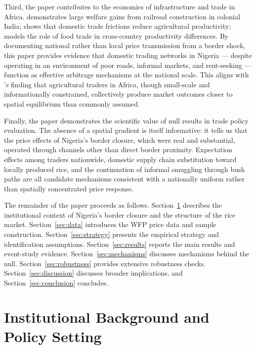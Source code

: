 \documentclass[12pt]{article}
\begin{document}
Third, the paper contributes to the economics of infrastructure and trade in Africa. \citet{donaldson2018railroads} demonstrates large welfare gains from railroad construction in colonial India; \citet{sotelo2020domestic} shows that domestic trade frictions reduce agricultural productivity; \citet{tombe2015geography} models the role of food trade in cross-country productivity differences. By documenting national rather than local price transmission from a border shock, this paper provides evidence that domestic trading networks in Nigeria --- despite operating in an environment of poor roads, informal markets, and rent-seeking --- function as effective arbitrage mechanisms at the national scale. This aligns with \citet{fafchamps2006agricultural}'s finding that agricultural traders in Africa, though small-scale and informationally constrained, collectively produce market outcomes closer to spatial equilibrium than commonly assumed.

Finally, the paper demonstrates the scientific value of null results in trade policy evaluation. The absence of a spatial gradient is itself informative: it tells us that the price effects of Nigeria's border closure, which were real and substantial, operated through channels other than direct border proximity. Expectation effects among traders nationwide, domestic supply chain substitution toward locally produced rice, and the continuation of informal smuggling through bush paths are all candidate mechanisms consistent with a nationally uniform rather than spatially concentrated price response.

The remainder of the paper proceeds as follows. Section~\ref{sec:background} describes the institutional context of Nigeria's border closure and the structure of the rice market. Section~\ref{sec:data} introduces the WFP price data and sample construction. Section~\ref{sec:strategy} presents the empirical strategy and identification assumptions. Section~\ref{sec:results} reports the main results and event-study evidence. Section~\ref{sec:mechanisms} discusses mechanisms behind the null. Section~\ref{sec:robustness} provides extensive robustness checks. Section~\ref{sec:discussion} discusses broader implications, and Section~\ref{sec:conclusion} concludes.


\section{Institutional Background and Policy Setting}
\label{sec:background}
\end{document}
